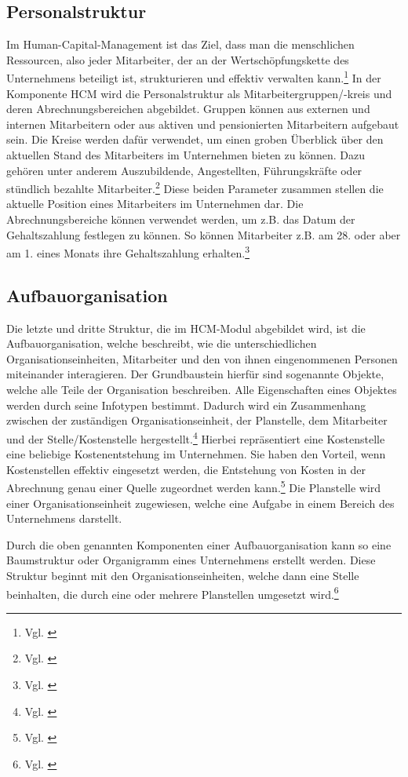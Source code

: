 \subsection{Personalstruktur}
Im Human-Capital-Management ist das Ziel, dass man die menschlichen Ressourcen, also jeder Mitarbeiter, der an der Wertschöpfungskette des Unternehmens beteiligt ist, strukturieren und effektiv verwalten kann.\footnote{Vgl. \cite{GablerWirtschaftslexikon2018}}
In der Komponente HCM wird die Personalstruktur als Mitarbeitergruppen/-kreis und deren Abrechnungsbereichen abgebildet.
Gruppen können aus externen und internen Mitarbeitern oder aus aktiven und pensionierten Mitarbeitern aufgebaut sein.
Die Kreise werden dafür verwendet, um einen groben Überblick über den aktuellen Stand des Mitarbeiters im Unternehmen bieten zu können.
Dazu gehören unter anderem Auszubildende, Angestellten, Führungskräfte oder stündlich bezahlte Mitarbeiter.\footnote{Vgl. \cite{SAPSE2024a}}
Diese beiden Parameter zusammen stellen die aktuelle Position eines Mitarbeiters im Unternehmen dar. 
Die Abrechnungsbereiche können verwendet werden, um z.B. das Datum der Gehaltszahlung festlegen zu können.
So können Mitarbeiter z.B. am 28. oder aber am 1. eines Monats ihre Gehaltszahlung erhalten.\footnote{Vgl. \cite{SAPSE2024a}}

\subsection{Aufbauorganisation}
Die letzte und dritte Struktur, die im HCM-Modul abgebildet wird, ist die Aufbauorganisation, welche beschreibt, wie die unterschiedlichen Organisationseinheiten, Mitarbeiter und den von ihnen eingenommenen Personen miteinander interagieren.
Der Grundbaustein hierfür sind sogenannte Objekte, welche alle Teile der Organisation beschreiben. Alle Eigenschaften eines Objektes werden durch seine Infotypen bestimmt.
Dadurch wird ein Zusammenhang zwischen der zuständigen Organisationseinheit, der Planstelle, dem Mitarbeiter und der Stelle/Kostenstelle hergestellt.\footnote{Vgl. \cite{SSSUM2019a}}
Hierbei repräsentiert eine Kostenstelle eine beliebige Kostenentstehung im Unternehmen.
Sie haben den Vorteil, wenn Kostenstellen effektiv eingesetzt werden, die Entstehung von Kosten in der Abrechnung genau einer Quelle zugeordnet werden kann.\footnote{Vgl. \cite{SAPSE2024b}}
Die Planstelle wird einer Organisationseinheit zugewiesen, welche eine Aufgabe in einem Bereich des Unternehmens darstellt.

Durch die oben genannten Komponenten einer Aufbauorganisation kann so eine Baumstruktur oder Organigramm eines Unternehmens erstellt werden.
Diese Struktur beginnt mit den Organisationseinheiten, welche dann eine Stelle beinhalten, die durch eine oder mehrere Planstellen umgesetzt wird.\footnote{Vgl. \cite{SAPSE2024c}}


